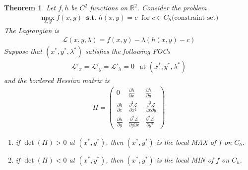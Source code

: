 \documentclass[10pt,a4paper]{book}
\newtheorem{theorem}{Theorem}[section]
\theoremstyle{definition}\newtheorem{definition}{Definition}
\theoremstyle{definition}\newtheorem{fact}{Fact}
\theoremstyle{definition}\newtheorem{ex}{Ex.}
\theoremstyle{definition}\newtheorem{project}{Project}
\theoremstyle{definition}\newtheorem{problem}{Problem}
\theoremstyle{definition}\newtheorem{example}{Example}
\numberwithin{theorem}{chapter}
\numberwithin{corollary}{chapter}
\numberwithin{assumption}{chapter}
\numberwithin{definition}{chapter}
\numberwithin{prop}{chapter}
\numberwithin{notation}{chapter}
\numberwithin{problem}{chapter}
\numberwithin{example}{chapter}
\numberwithin{fact}{chapter}
\numberwithin{ex}{chapter}
\newenvironment{ftheorem}
{\begin{mdframed}\begin{theorem}}
		{\end{theorem}\end{mdframed}}
\def\R{\mathbb R}
\def\R{\mathbb R}
\begin{document}
	\begin{ftheorem}
		Let $f,h$ be $C^2$ functions on $\R^2$. Consider the problem
		\begin{align*}
			\max_{x,y} f(x,y) \ \textbf{ s.t. } h(x,y) = c  \ \text{ for } c \in C_h \text{(constraint set)} 
		\end{align*}
		The Lagrangian is
		\begin{align*}
			\mathcal{L}(x,y,\lambda) = f(x,y) - \lambda (h(x,y) - c) 
		\end{align*}
		Suppose that $(x^*, y^*, \lambda^*)$ satisfies the following FOCs
		\begin{align*}
			\mathcal{L}'_x = \mathcal{L}'_y = \mathcal{L}'_\lambda = 0 \ \ \text{ at $(x^*,y^*,\lambda^*)$} 
		\end{align*}
		and the bordered Hessian matrix is
		\begin{align*}
			H = \begin{pmatrix}
				0                             & \frac{\partial h}{\partial x}                        & \frac{\partial h}{\partial y}                        \\
				\frac{\partial h}{\partial x} & \frac{\partial^2 \mathcal{L}}{\partial x^2}          & \frac{\partial^2 \mathcal{L}}{\partial x \partial y} \\
				\frac{\partial h}{\partial y} & \frac{\partial^2 \mathcal{L}}{\partial y \partial x} & \frac{\partial^2 \mathcal{L}}{\partial y^2}          
			\end{pmatrix}
		\end{align*}
		\begin{enumerate}
			\item 		if $\det(H) > 0$ at $(x^*, y^*)$, then $(x^*, y^*)$ is the local MAX of $f$ on $C_h$.
			\item 		if $\det(H) < 0$ at $(x^*, y^*)$, then $(x^*, y^*)$ is the local MIN of $f$ on $C_h$.
		\end{enumerate}
	\end{ftheorem}
	
\end{document}
